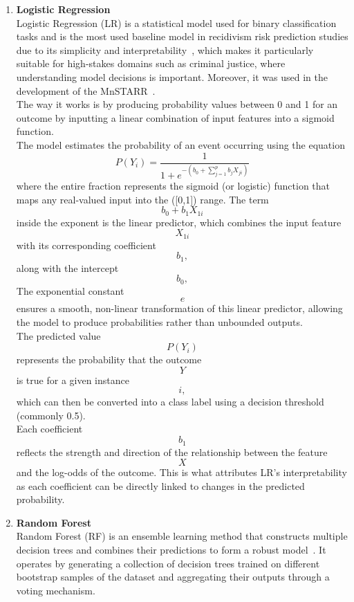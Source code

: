 \documentclass[12pt]{article}
\begin{document}
\begin{enumerate}
  \item \textbf{Logistic Regression} \\
    \tab Logistic Regression (LR) is a statistical model used for binary classification tasks and is the most used baseline model in recidivism risk prediction studies due to its simplicity and interpretability~\cite{travaini2022machine}, which makes it particularly suitable for high-stakes domains such as criminal justice, where understanding model decisions is important. Moreover, it was used in the development of the MnSTARR~\cite{duwe2014development}.\\

    The way it works is by producing probability values between 0 and 1 for an outcome by inputting a linear combination of input features into a sigmoid function. \\
    
    The model estimates the probability of an event occurring using the equation \[ P(Y_i)=\frac{1}{1+e^{-(b_0+\sum_{j=1}^{p} b_j X_{ji})}} \] where the entire fraction represents the sigmoid (or logistic) function that maps any real-valued input into the ([0,1]) range. The term \[ b_0 + b_1X_{1i} \] inside the exponent is the linear predictor, which combines the input feature \[ X_{1i} \] with its corresponding coefficient \[ b_1, \] along with the intercept \[ b_0,  \] The exponential constant \[ e \] ensures a smooth, non-linear transformation of this linear predictor, allowing the model to produce probabilities rather than unbounded outputs.\\
    
    The predicted value \[ P(Y_i) \] represents the probability that the outcome \[ Y \] is true for a given instance \[ i, \] which can then be converted into a class label using a decision threshold (commonly 0.5).\\
    
    Each coefficient \[ b_1 \] reflects the strength and direction of the relationship between the feature \[ X \] and the log-odds of the outcome. This is what attributes LR's interpretability as each coefficient can be directly linked to changes in the predicted probability.\\

  \item \textbf{Random Forest}\\
    \tab Random Forest (RF) is an ensemble learning method that constructs multiple decision trees and combines their predictions to form a robust model~\cite{kovalchuk2023prediction}. It operates by generating a collection of decision trees trained on different bootstrap samples of the dataset and aggregating their outputs through a voting mechanism.\\
    

\end{enumerate}
\end{document}
